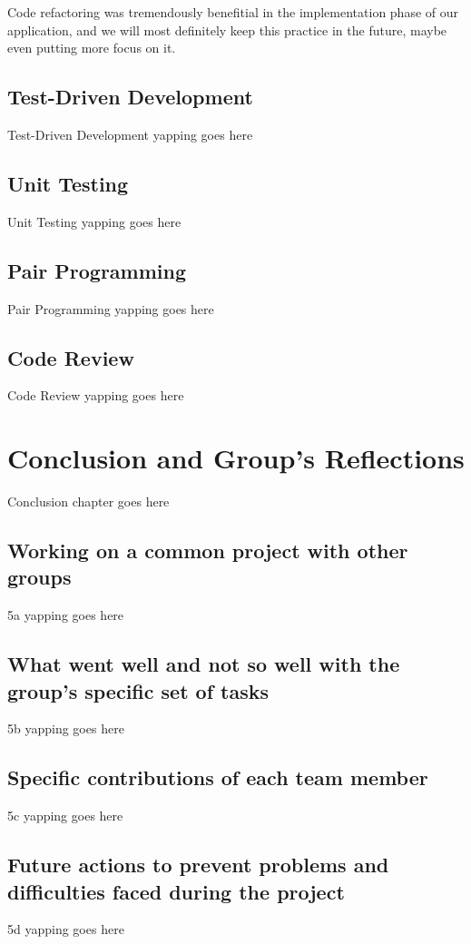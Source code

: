 \documentclass[12pt]{report}
\begin{document}
Code refactoring was tremendously benefitial in the implementation phase of our application, and we will most definitely
keep this practice in the future, maybe even putting more focus on it.

\section{Test-Driven Development}
Test-Driven Development yapping goes here

\section{Unit Testing}
Unit Testing yapping goes here

\section{Pair Programming}
Pair Programming yapping goes here

\section{Code Review}
Code Review yapping goes here

\chapter{Conclusion and Group's Reflections}
Conclusion chapter goes here

\section{Working on a common project with other groups}
5a yapping goes here

\section{What went well and not so well with the group's specific set of tasks}
5b yapping goes here

\section{Specific contributions of each team member}
5c yapping goes here

\label{sec:nnexplanation} %

\section{Future actions to prevent problems and difficulties faced during the project}
5d yapping goes here
\end{document}
